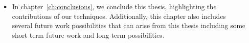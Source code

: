 \begin{itemize}
	\item In chapter~\ref{ch:conclusions}, we conclude this thesis, highlighting the contributions of our techniques. 
	Additionally, this chapter also includes several future work possibilities that can arise from this thesis including some short-term future work and long-term possibilities.  
	
	
\end{itemize}
